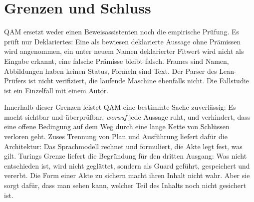 \section{Grenzen und Schluss}\label{sec:grenzen}

QAM ersetzt weder einen Beweisassistenten noch die empirische Prüfung. Es prüft nur Deklariertes: Eine als bewiesen deklarierte Aussage
ohne Prämissen wird angenommen, ein unter neuem Namen deklarierter Fitwert wird nicht als Eingabe erkannt, eine falsche Prämisse bleibt
falsch. Frames sind Namen, Abbildungen haben keinen Status, Formeln sind Text. Der Parser des Lean-Prüfers ist nicht verifiziert, die
laufende Maschine ebenfalls nicht. Die Fallstudie ist ein Einzelfall mit einem Autor.

Innerhalb dieser Grenzen leistet QAM eine bestimmte Sache zuverlässig: Es macht sichtbar und überprüfbar, \emph{worauf} jede Aussage ruht, und
verhindert, dass eine offene Bedingung auf dem Weg durch eine lange Kette von Schlüssen verloren geht. Zuses Trennung von Plan und
Ausführung liefert dafür die Architektur: Das Sprachmodell rechnet und formuliert, die Akte legt fest, was gilt. Turings Grenze liefert die
Begründung für den dritten Ausgang: Was nicht entschieden ist, wird nicht geglättet, sondern als Guard geführt, gespeichert und vererbt.
Die Form einer Akte zu sichern macht ihren Inhalt nicht wahr. Aber sie sorgt dafür, dass man sehen kann, welcher Teil des Inhalts noch nicht
gesichert ist.
